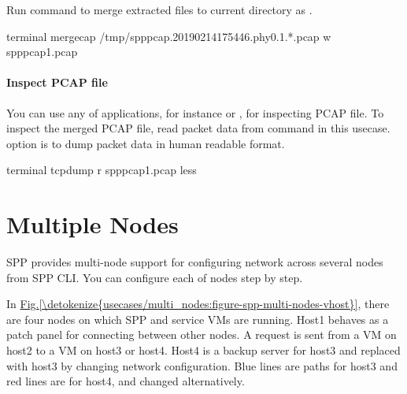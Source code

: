 \documentclass[a4paper,11pt,openany,oneside,english]{sphinxmanual}
\begin{document}
Run  command to merge extracted files to current directory
as .

\begin{sphinxVerbatim}[commandchars=\\\{\},formatcom=\footnotesize]
 terminal 
 mergecap /tmp/spp\PYGZus{}pcap.20190214175446.phy0.1.*.pcap \PYGZhy{}w spp\PYGZus{}pcap1.pcap
\end{sphinxVerbatim}


\paragraph{Inspect PCAP file}
\label{\detokenize{usecases/spp_pcap:inspect-pcap-file}}
You can use any of applications, for instance  or ,
for inspecting PCAP file.
To inspect the merged PCAP file, read packet data from  command
in this usecase.  option is to dump packet data in human readable format.

\begin{sphinxVerbatim}[commandchars=\\\{\},formatcom=\footnotesize]
 terminal 
 tcpdump \PYGZhy{}r spp\PYGZus{}pcap1.pcap  less
\end{sphinxVerbatim}


\section{Multiple Nodes}
\label{\detokenize{usecases/multi_nodes:multiple-nodes}}\label{\detokenize{usecases/multi_nodes:usecase-multi-node}}\label{\detokenize{usecases/multi_nodes::doc}}
SPP provides multi-node support for configuring network across several nodes
from SPP CLI. You can configure each of nodes step by step.

In \hyperref[\detokenize{usecases/multi_nodes:figure-spp-multi-nodes-vhost}]{Fig.\@ \ref{\detokenize{usecases/multi_nodes:figure-spp-multi-nodes-vhost}}}, there are four nodes on which
SPP and service VMs are running. Host1 behaves as a patch panel for connecting
between other nodes. A request is sent from a VM on host2 to a VM on host3 or
host4. Host4 is a backup server for host3 and replaced with host3 by changing
network configuration. Blue lines are paths for host3 and red lines are for
host4, and changed alternatively.
\end{document}

